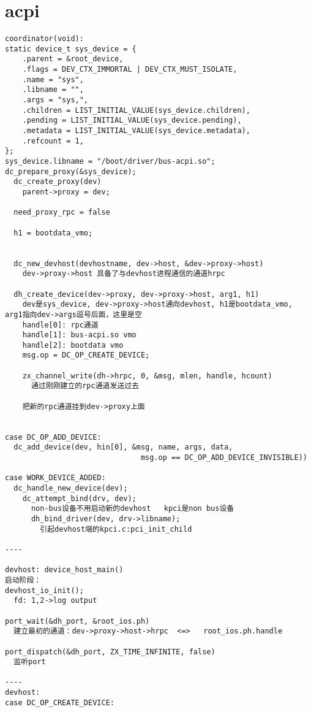 \section{acpi}

\begin{verbatim}
coordinator(void):
static device_t sys_device = {
    .parent = &root_device,
    .flags = DEV_CTX_IMMORTAL | DEV_CTX_MUST_ISOLATE,
    .name = "sys",
    .libname = "",
    .args = "sys,",
    .children = LIST_INITIAL_VALUE(sys_device.children),
    .pending = LIST_INITIAL_VALUE(sys_device.pending),
    .metadata = LIST_INITIAL_VALUE(sys_device.metadata),
    .refcount = 1,
};
sys_device.libname = "/boot/driver/bus-acpi.so";
dc_prepare_proxy(&sys_device);   
  dc_create_proxy(dev) 
    parent->proxy = dev;

  need_proxy_rpc = false

  h1 = bootdata_vmo;


  dc_new_devhost(devhostname, dev->host, &dev->proxy->host)
    dev->proxy->host 具备了与devhost进程通信的通道hrpc

  dh_create_device(dev->proxy, dev->proxy->host, arg1, h1)
    dev是sys_device, dev->proxy->host通向devhost, h1是bootdata_vmo, arg1指向dev->args逗号后面，这里是空
    handle[0]: rpc通道
    handle[1]: bus-acpi.so vmo
    handle[2]: bootdata vmo
    msg.op = DC_OP_CREATE_DEVICE;

    zx_channel_write(dh->hrpc, 0, &msg, mlen, handle, hcount)
      通过刚刚建立的rpc通道发送过去
    
    把新的rpc通道挂到dev->proxy上面

  
case DC_OP_ADD_DEVICE:
  dc_add_device(dev, hin[0], &msg, name, args, data,
                               msg.op == DC_OP_ADD_DEVICE_INVISIBLE))

case WORK_DEVICE_ADDED:
  dc_handle_new_device(dev);
    dc_attempt_bind(drv, dev);
      non-bus设备不用启动新的devhost   kpci是non bus设备
      dh_bind_driver(dev, drv->libname);
        引起devhost端的kpci.c:pci_init_child

----

devhost: device_host_main()
启动阶段：
devhost_io_init();
  fd: 1,2->log output

port_wait(&dh_port, &root_ios.ph)
  建立最初的通道：dev->proxy->host->hrpc  <=>   root_ios.ph.handle

port_dispatch(&dh_port, ZX_TIME_INFINITE, false)
  监听port

----
devhost:
case DC_OP_CREATE_DEVICE:
  

\end{verbatim}
